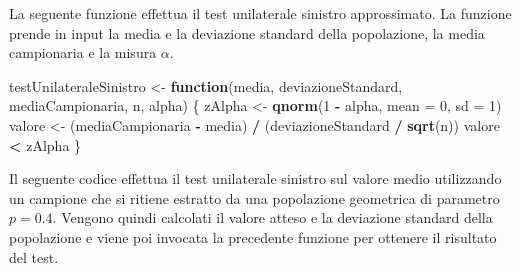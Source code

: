 \documentclass[]{book}
\newenvironment{Shaded}{\begin{snugshade}}{\end{snugshade}}
\newcommand{\KeywordTok}[1]{\textcolor[rgb]{0.13,0.29,0.53}{\textbf{#1}}}
\newcommand{\DataTypeTok}[1]{\textcolor[rgb]{0.13,0.29,0.53}{#1}}
\newcommand{\DecValTok}[1]{\textcolor[rgb]{0.00,0.00,0.81}{#1}}
\newcommand{\StringTok}[1]{\textcolor[rgb]{0.31,0.60,0.02}{#1}}
\newcommand{\ControlFlowTok}[1]{\textcolor[rgb]{0.13,0.29,0.53}{\textbf{#1}}}
\newcommand{\OperatorTok}[1]{\textcolor[rgb]{0.81,0.36,0.00}{\textbf{#1}}}
\newcommand{\NormalTok}[1]{#1}
\begin{document}
La seguente funzione effettua il test unilaterale sinistro approssimato.
La funzione prende in input la media e la deviazione standard della
popolazione, la media campionaria e la misura \(\alpha\).

\begin{Shaded}
\begin{Highlighting}[]
\NormalTok{testUnilateraleSinistro <-}\StringTok{ }\ControlFlowTok{function}\NormalTok{(media, deviazioneStandard, mediaCampionaria, n, alpha) \{}
\NormalTok{  zAlpha <-}\StringTok{ }\KeywordTok{qnorm}\NormalTok{(}\DecValTok{1} \OperatorTok{-}\StringTok{ }\NormalTok{alpha, }\DataTypeTok{mean =} \DecValTok{0}\NormalTok{, }\DataTypeTok{sd =} \DecValTok{1}\NormalTok{)}
\NormalTok{  valore <-}\StringTok{ }\NormalTok{(mediaCampionaria }\OperatorTok{-}\StringTok{ }\NormalTok{media) }\OperatorTok{/}\StringTok{ }\NormalTok{(deviazioneStandard }\OperatorTok{/}\StringTok{ }\KeywordTok{sqrt}\NormalTok{(n))}
\NormalTok{  valore }\OperatorTok{<}\StringTok{ }\NormalTok{zAlpha}
\NormalTok{\}}
\end{Highlighting}
\end{Shaded}

Il seguente codice effettua il test unilaterale sinistro sul valore
medio utilizzando un campione che si ritiene estratto da una popolazione
geometrica di parametro \(p = 0.4\). Vengono quindi calcolati il valore
atteso e la deviazione standard della popolazione e viene poi invocata
la precedente funzione per ottenere il risultato del test.
\end{document}
